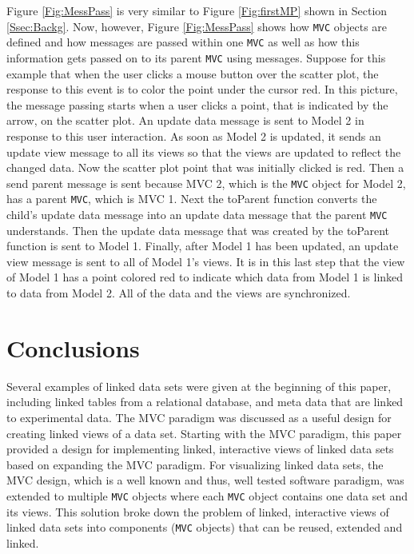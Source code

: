 \documentclass{article}[11pt]
\newcommand{\Rfunction}[1]{{\textsf{#1}}}
\newcommand{\Robject}[1]{{\texttt{#1}}}
\begin{document}
Figure \ref{Fig:MessPass} is very similar to Figure \ref{Fig:firstMP} shown in
Section \ref{Ssec:Backg}.  Now, however, Figure \ref{Fig:MessPass} shows how
\Robject{MVC} objects are defined and how messages are passed within one
\Robject{MVC} as well as how this information gets passed on to its parent
\Robject{MVC} using messages.  Suppose for this example that when the user
clicks a mouse button over the scatter plot, the response to this event is to
color the point under the cursor 
red.  In this picture, the message passing starts when a user clicks a point,
that is indicated by the arrow, on the scatter plot.  An update data message is
sent to Model 2 in response to this user interaction.  As soon as Model 2 is
updated, it sends an update view message to all its views so that the views
are updated to reflect the changed data.  Now the scatter plot point that was
initially clicked is red.  Then a send parent message is sent because MVC
2, which is the \Robject{MVC} object for Model 2, has a parent \Robject{MVC},
which is MVC 1.  Next the \Rfunction{toParent} function converts the child's
update data message into an update data message that the parent \Robject{MVC}
understands.  Then the update data message that was created by the
\Rfunction{toParent} function is sent to Model 1.  Finally, after Model 1 has
been updated, an update view message is sent to all of Model 1's views.  It is
in this last step that the view of Model 1 has a point colored red to indicate
which data from Model 1 is linked to data from Model 2.  All of the data and
the views are synchronized. 

\section{Conclusions}\label{Sec:Conc}

Several examples of linked data sets were given at the beginning of this
paper, including linked tables from a relational database, and meta data that
are linked to experimental data.  The MVC paradigm was
discussed as a useful design for creating linked views of a data set.
Starting with the MVC paradigm, this paper provided a design for implementing
linked, interactive views of linked data sets based on expanding the MVC
paradigm.  For visualizing linked data sets, the MVC design, which is a well
known and thus, well tested software paradigm, was extended to multiple
\Robject{MVC} objects where each \Robject{MVC} object contains one data set
and its views.  This solution broke down the problem of linked, interactive
views of linked data sets into components (\Robject{MVC} objects) that can be
reused, extended and linked. 
\end{document}
